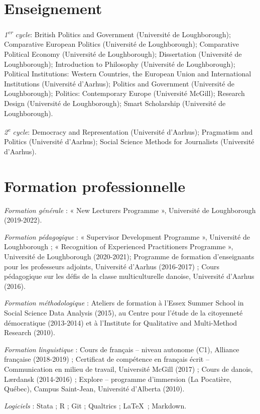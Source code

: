 \documentclass[letterpaper,fontsize=10.5pt]{scrartcl}
\begin{document}
\section{Enseignement}
{}\textit{1\textsuperscript{er} cycle}: British Politics and Government (Université de Loughborough); Comparative European Politics (Université de Loughborough); Comparative Political Economy (Université de Loughborough); Dissertation (Université de Loughborough); Introduction to Philosophy (Université de Loughborough); Political Institutions: Western Countries, the European Union and International Institutions (Université d'Aarhus); Politics and Government (Université de Loughborough); Politics: Contemporary Europe (Université McGill); Research Design (Université de Loughborough); Smart Scholarship (Université de Loughborough).\\
\hfill \break
{}
{}\textit{2\textsuperscript{e} cycle}: Democracy and Representation (Université d'Aarhus); Pragmatism and Politics (Université d'Aarhus); Social Science Methods for Journalists (Université d'Aarhus).

\section{Formation professionnelle}
{}\textit{Formation générale} : « New Lecturers Programme », Université de Loughborough (2019-2022).\\
\hfill \break
{}
{}\textit{Formation pédagogique} : « Supervisor Development Programme », Université de Loughborough ; « Recognition of Experienced Practitioners Programme », Université de Loughborough (2020-2021); Programme de formation d'enseignants pour les professeurs adjoints, Université d'Aarhus (2016-2017) ; Cours pédagogique sur les défis de la classe multiculturelle danoise, Université d'Aarhus (2016).\\
\hfill \break
{}
{}\textit{Formation méthodologique} : Ateliers de formation à l'Essex Summer School in Social Science Data Analysis (2015), au Centre pour l’étude de la citoyenneté démocratique (2013-2014) et	à l'Institute for Qualitative and Multi-Method Research (2010).\\
\hfill \break
{}
{}\textit{Formation linguistique} : Cours de français – niveau autonome (C1), Alliance française (2018-2019) ; Certificat de compétence en français écrit – Communication en milieu de travail, Université McGill (2017) ; Cours de danois, Lærdansk (2014-2016) ; Explore – programme d'immersion (La Pocatière, Québec), Campus Saint-Jean, Université d'Alberta (2010).\\
\hfill \break
{}
{}\textit{Logiciels} : Stata ; R ; Git ; Qualtrics ; \LaTeX\ ; Markdown.
\end{document}
